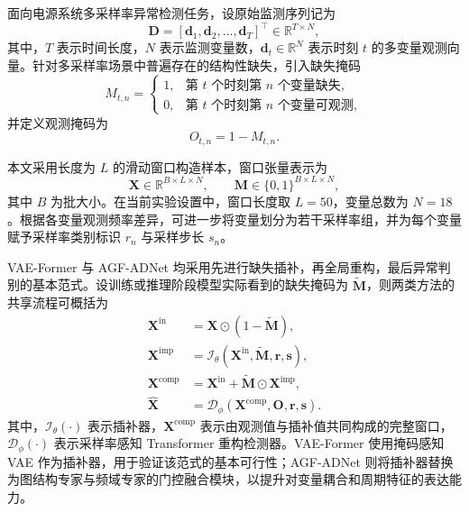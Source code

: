 \documentclass[bachelor, vlined]{DissertUESTC}
\begin{document}
    面向电源系统多采样率异常检测任务，设原始监测序列记为
    \begin{equation}
        \mathbf{D} = [\mathbf{d}_1,\mathbf{d}_2,\ldots,\mathbf{d}_T]^\top \in \mathbb{R}^{T \times N},
    \end{equation}
    其中，$T$ 表示时间长度，$N$ 表示监测变量数，$\mathbf{d}_t \in \mathbb{R}^{N}$ 表示时刻 $t$ 的多变量观测向量。针对多采样率场景中普遍存在的结构性缺失，引入缺失掩码
    \begin{equation}
        M_{t,n} =
        \begin{cases}
            1, & \text{第 $t$ 个时刻第 $n$ 个变量缺失},\\
            0, & \text{第 $t$ 个时刻第 $n$ 个变量可观测},
        \end{cases}
    \end{equation}
    并定义观测掩码为
    \begin{equation}
        O_{t,n} = 1 - M_{t,n}.
    \end{equation}

    本文采用长度为 $L$ 的滑动窗口构造样本，窗口张量表示为
    \begin{equation}
        \mathbf{X} \in \mathbb{R}^{B \times L \times N}, \qquad
        \mathbf{M} \in \{0,1\}^{B \times L \times N},
    \end{equation}
    其中 $B$ 为批大小。在当前实验设置中，窗口长度取 $L=50$，变量总数为 $N=18$。根据各变量观测频率差异，可进一步将变量划分为若干采样率组，并为每个变量赋予采样率类别标识 $r_n$ 与采样步长 $s_n$。

    VAE-Former 与 AGF-ADNet 均采用先进行缺失插补，再全局重构，最后异常判别的基本范式。设训练或推理阶段模型实际看到的缺失掩码为 $\widetilde{\mathbf{M}}$，则两类方法的共享流程可概括为
    \begin{align}
        \mathbf{X}^{\mathrm{in}} &= \mathbf{X} \odot (1-\widetilde{\mathbf{M}}), \\
        \mathbf{X}^{\mathrm{imp}} &= \mathcal{I}_{\theta}\!\left(\mathbf{X}^{\mathrm{in}},\widetilde{\mathbf{M}},\mathbf{r},\mathbf{s}\right), \\
        \mathbf{X}^{\mathrm{comp}} &= \mathbf{X}^{\mathrm{in}} + \widetilde{\mathbf{M}} \odot \mathbf{X}^{\mathrm{imp}}, \\
        \hat{\mathbf{X}} &= \mathcal{D}_{\phi}\!\left(\mathbf{X}^{\mathrm{comp}},\mathbf{O},\mathbf{r},\mathbf{s}\right).
    \end{align}
    其中，$\mathcal{I}_{\theta}(\cdot)$ 表示插补器，$\mathbf{X}^{\mathrm{comp}}$ 表示由观测值与插补值共同构成的完整窗口，$\mathcal{D}_{\phi}(\cdot)$ 表示采样率感知 Transformer 重构检测器。VAE-Former 使用掩码感知 VAE 作为插补器，用于验证该范式的基本可行性；AGF-ADNet 则将插补器替换为图结构专家与频域专家的门控融合模块，以提升对变量耦合和周期特征的表达能力。
\end{document}
